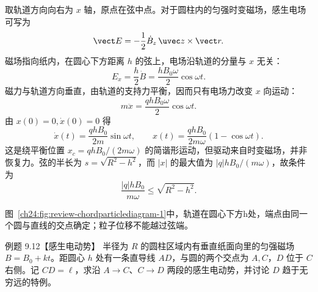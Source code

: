 \begin{xesolution}
取轨道方向向右为 $x$ 轴，原点在弦中点。对于圆柱内的匀强时变磁场，感生电场可写为
\begin{equation}
  \vect E=-\frac12\dot B_z\,\uvec z\times\vect r.
\end{equation}
磁场指向纸内，在圆心下方距离 $h$ 的弦上，电场沿轨道的分量与 $x$ 无关：
\begin{equation}
  E_x=\frac h2\dot B=\frac{hB_0\omega}{2}\cos\omega t.
\end{equation}
磁力与轨道方向垂直，由轨道的支持力平衡，因而只有电场力改变 $x$ 向运动：
\begin{equation}
  m\ddot x=\frac{qhB_0\omega}{2}\cos\omega t.
\end{equation}
由 $x(0)=0,\dot x(0)=0$ 得
\begin{equation}
  \boxed{\dot x(t)=\frac{qhB_0}{2m}\sin\omega t},
  \qquad
  \boxed{x(t)=\frac{qhB_0}{2m\omega}(1-\cos\omega t)}.
\end{equation}
这是绕平衡位置 $x_c=qhB_0/(2m\omega)$ 的简谐形运动，但驱动来自时变磁场，并非恢复力。弦的半长为
$s=\sqrt{R^2-h^2}$，而 $|x|$ 的最大值为 $|q|hB_0/(m\omega)$，故条件为
\begin{equation}
  \boxed{\frac{|q|hB_0}{m\omega}\le\sqrt{R^2-h^2}}.
\end{equation}

图~\ref{ch24:fig:review-chordparticlediagram-1}中，轨道在圆心下方h处，端点由同一个圆与直线的交点确定；粒子位移不能越过弦端。
\par\noindent\begin{minipage}{\linewidth}
\chordParticleDiagram
{}\label{ch24:fig:review-chordparticlediagram-1}
\end{minipage}\par\medskip
\end{xesolution}

\begin{origexamplebox}{例题 9.12【感生电动势】}
半径为 $R$ 的圆柱区域内有垂直纸面向里的匀强磁场
$B=B_0+kt$。距圆心 $h$ 处有一条直导线 $AD$，与圆的两个交点为 $A,C$，$D$ 位于 $C$ 右侧。记 $CD=\ell$，求沿 $A\to C$、$C\to D$ 两段的感生电动势，并讨论 $D$ 趋于无穷远的特例。

%
\begin{center}\end{center}
\label{fig:em24-question-12}
\end{origexamplebox}


